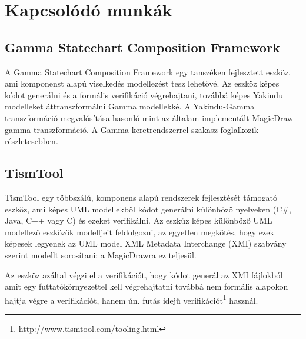 \chapter{Kapcsolódó munkák}
\label{chap:related-work}
\section{Gamma Statechart Composition Framework}
A Gamma Statechart Composition Framework\cite{gammaf} egy tanszéken fejlesztett eszköz, ami komponenst alapú viselkedés modellezést tesz lehetővé. Az eszköz képes kódot generálni és a formális verifikáció végrehajtani, továbbá képes Yakindu modelleket áttranszformálni Gamma modellekké. A Yakindu-Gamma transzformáció megvalósítása hasonló mint az általam implementált MagicDraw-gamma transzformáció. A Gamma keretrendszerrel  szakasz foglalkozik részletesebben. 

\section{TismTool}

TismTool\cite{veugen2012framework} egy többszálú, komponens alapú rendszerek fejlesztését támogató eszköz, ami képes UML modellekből kódot generálni különböző nyelveken (C\#, Java, C++ vagy C) és ezeket verifikálni. Az eszküz képes különböző UML modellező eszközök modelljeit feldolgozni, az egyetlen megkötés, hogy ezek képesek legyenek az UML model XML Metadata Interchange (XMI) szabvány szerint modellt sorosítani: a MagicDrawra ez teljesül.

Az eszköz azáltal végzi el a verifikációt, hogy kódot generál az XMI fájlokból amit egy futtatókörnyezettel kell végrehajtatni továbbá nem formális alapokon hajtja végre a verifikációt, hanem ún. futás idejű verifikációt\footnote{http://www.tismtool.com/tooling.html} használ.





